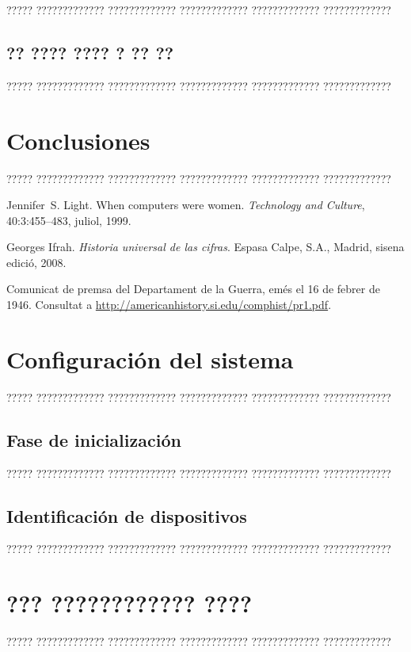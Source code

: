 \documentclass[11pt,spanish,listoffigures,listoftables]{tfgetsinf}
\begin{document}
????? ????????????? ????????????? ????????????? ????????????? ????????????? 

\section{?? ???? ???? ? ?? ??}

????? ????????????? ????????????? ????????????? ????????????? ?????????????


\chapter{Conclusiones}

????? ????????????? ????????????? ????????????? ????????????? ????????????? 


\begin{thebibliography}{10}

   Jennifer~S. Light.
   \newblock When computers were women.
   \newblock \textit{Technology and Culture}, 40:3:455--483, juliol, 1999.

   Georges Ifrah.
   \newblock \textit{Historia universal de las cifras}.
   \newblock Espasa Calpe, S.A., Madrid, sisena edició, 2008.

   Comunicat de premsa del Departament de la Guerra, 
   emés el 16 de febrer de 1946. 
   \newblock Consultat a 
   \url{http://americanhistory.si.edu/comphist/pr1.pdf}.

\end{thebibliography}
\cleardoublepage


\APPENDIX

\chapter{Configuración del sistema}

????? ????????????? ????????????? ????????????? ????????????? ?????????????

\section{Fase de inicialización}

????? ????????????? ????????????? ????????????? ????????????? ?????????????

\section{Identificación de dispositivos}

????? ????????????? ????????????? ????????????? ????????????? ?????????????


\chapter{??? ???????????? ????}

????? ????????????? ????????????? ????????????? ????????????? ????????????? 

\end{document}
